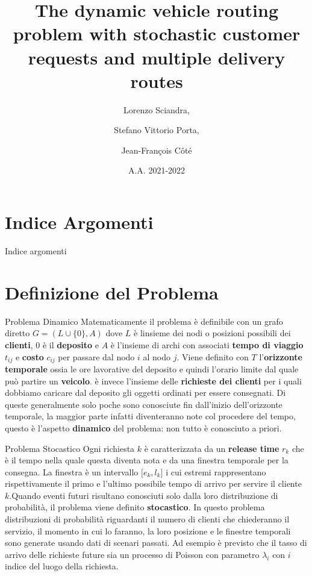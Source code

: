 \documentclass[10pt]{beamer}
\title{The dynamic vehicle routing problem with stochastic customer requests and multiple delivery routes}
\author{Lorenzo Sciandra, \and Stefano Vittorio Porta, \and \newline Jean-François Côté\\}
\date{A.A. 2021-2022}
\institute{Università degli Studi di Torino}
\begin{document}
    \maketitle

    \section*{Indice Argomenti}\label{sec:indice-argomenti}

    \begin{frame}{Indice argomenti}
        \tableofcontents
    \end{frame}
    
    \section{Definizione del Problema}\label{sec:def-problema}

    \begin{frame}{Problema Dinamico}
        Matematicamente il problema è definibile con un grafo diretto {\(G = (L \cup \{ 0\},A)\)} dove {\(L\)} è l\textquotesingle insieme dei nodi o posizioni possibili dei \textbf{clienti}, {\(0\)} è il \textbf{deposito} e {\(A\)} è l'insieme di archi con associati \textbf{tempo di viaggio} {\(t_{ij}\)} e \textbf{costo} {\(c_{ij}\)} per passare dal nodo {\(i\)} al nodo {\(j\)}. \newline Viene definito con {\(T\)} l'\textbf{orizzonte temporale} ossia le ore lavorative del deposito e quindi l'orario limite dal quale può partire un \textbf{veicolo}.  è invece l'insieme delle \textbf{richieste dei clienti} per i quali dobbiamo caricare dal deposito gli oggetti ordinati per essere consegnati. Di queste generalmente solo poche sono conosciute fin dall'inizio dell'orizzonte temporale, la maggior parte infatti diventeranno note col procedere del tempo, questo è l'aspetto \textbf{dinamico} del problema: non tutto è conosciuto a priori.
    \end{frame}

    \begin{frame}{Problema Stocastico}  
    Ogni richiesta {\(k\)} è caratterizzata da un \textbf{release time} {\(r_{k}\)} che è il tempo nella quale questa diventa nota e da una finestra temporale per la consegna. La finestra è un intervallo {\(\lbrack e_{k},l_{k}\rbrack\)} i cui estremi rappresentano rispettivamente il primo e l'ultimo possibile tempo di arrivo per servire il cliente $k$.\newline Quando eventi futuri risultano conosciuti solo dalla loro distribuzione di probabilità, il problema viene definito \textbf{stocastico}. In questo problema distribuzioni di probabilità riguardanti il numero di clienti che chiederanno il servizio, il momento in cui lo faranno, la loro posizione e le finestre temporali sono generate usando dati di scenari passati. Ad esempio è previsto che il tasso di arrivo delle richieste future sia un processo di Poisson con parametro {\(\lambda_{i}\)} con {\(i\)} indice del luogo della richiesta.
    \end{frame}
    
\end{document}
